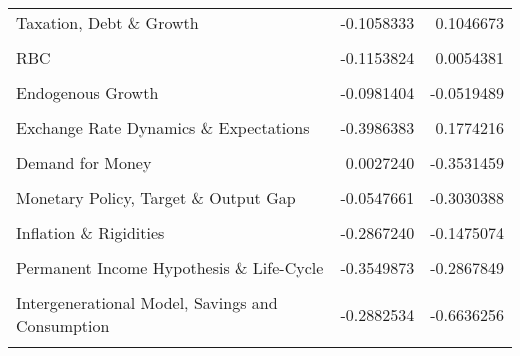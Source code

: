 \documentclass[
  12pt,
  onecolumn]{article}
\begin{document}
\begin{longtable}[t]{lrr}
\addlinespace
Taxation, Debt \& Growth & -0.1058333 & 0.1046673\\
\cellcolor{gray!6}{Monetary Policy, Financial Transmission \& Cycles 1} & \cellcolor{gray!6}{-0.1511096} & \cellcolor{gray!6}{0.0441990}\\
RBC & -0.1153824 & 0.0054381\\
\cellcolor{gray!6}{Coordination \& Sunspots 1} & \cellcolor{gray!6}{0.0664730} & \cellcolor{gray!6}{-0.2082945}\\
Endogenous Growth & -0.0981404 & -0.0519489\\
\addlinespace
\cellcolor{gray!6}{REH, Monetary Policy \& Business Cycles} & \cellcolor{gray!6}{-0.2171467} & \cellcolor{gray!6}{-0.0007970}\\
Exchange Rate Dynamics \& Expectations & -0.3986383 & 0.1774216\\
\cellcolor{gray!6}{Inflation, Interest Rates \& Expectations} & \cellcolor{gray!6}{-0.1050581} & \cellcolor{gray!6}{-0.1682303}\\
Demand for Money & 0.0027240 & -0.3531459\\
\cellcolor{gray!6}{Monetary Approach of Balance of Payments} & \cellcolor{gray!6}{-0.2916010} & \cellcolor{gray!6}{-0.0590268}\\
\addlinespace
Monetary Policy, Target \& Output Gap & -0.0547661 & -0.3030388\\
\cellcolor{gray!6}{Credit Rationing, Rational Expectations \& Imperfect Information} & \cellcolor{gray!6}{-0.1598390} & \cellcolor{gray!6}{-0.2050900}\\
Inflation \& Rigidities & -0.2867240 & -0.1475074\\
\cellcolor{gray!6}{New Theory of Money: Search, Bargaining...} & \cellcolor{gray!6}{-0.1669925} & \cellcolor{gray!6}{-0.3648415}\\
Permanent Income Hypothesis \& Life-Cycle & -0.3549873 & -0.2867849\\
\addlinespace
\cellcolor{gray!6}{Monetary Economics \& Demand for Money} & \cellcolor{gray!6}{-0.2531023} & \cellcolor{gray!6}{-0.4754408}\\
Intergenerational Model, Savings and Consumption & -0.2882534 & -0.6636256\\
\cellcolor{gray!6}{Marginal Taxation} & \cellcolor{gray!6}{-0.3048880} & \cellcolor{gray!6}{-0.9756722}\\*
\end{longtable}
\endgroup{}

\begingroup\fontsize{7}{9}\selectfont
\end{document}
